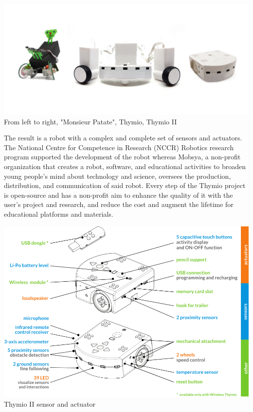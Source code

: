 \documentclass{scrbook}
\begin{document}
\begin{center}
  \includegraphics[width=\textwidth]{prototype_thymio_old}\\
  From left to right, "Monsieur Patate", Thymio, Thymio II
\end{center}

The result is a robot with a complex and complete set of sensors and actuators. 
The National Centre for Competence in Research (NCCR) Robotics research program supported the development of the robot whereas Mobsya, 
a non-profit organization that creates a robot, software, and educational activities to broaden young people's mind about technology and science, 
oversees the production, distribution, and communication of said robot. 
Every step of the Thymio project is open-source and has a non-profit aim to enhance the quality of it with the user's project and research, 
and reduce the cost and augment the lifetime for educational platforms and materials.

\begin{center}
  \includegraphics[width=\textwidth]{Wireless-thymioII-sensor-actuator-color-en}\\
  Thymio II sensor and actuator
\end{center}
\end{document}
